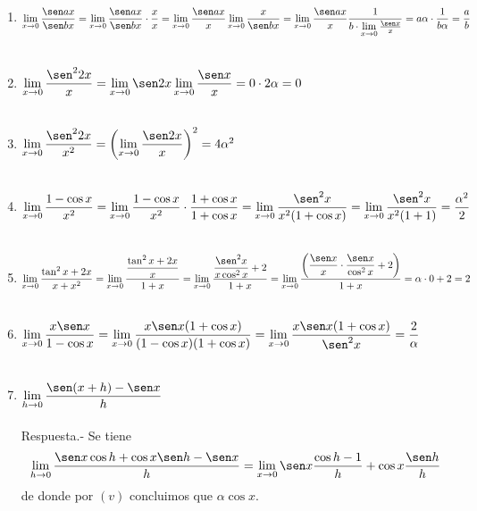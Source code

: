 \begin{enumerate}
\begin{enumerate}[\bfseries (i)]
    \item $\lim\limits_{x \to 0} \dfrac{\sen ax}{\sen bx} = \lim\limits_{x \to 0} \dfrac{\sen ax}{\sen bx}\cdot \dfrac{x}{x} = \lim\limits_{x\to 0} \dfrac{\sen ax}{x} \lim\limits_{x\to 0} \dfrac{x}{\sen bx}  = \lim\limits_{x\to 0} \dfrac{\sen ax}{x} \dfrac{1}{b \cdot \lim\limits_{x\to 0} \frac{\sen x}{x}} = a\alpha \cdot \dfrac{1}{b\alpha} = \dfrac{a}{b}$\\\\

    \item $\lim\limits_{x\to 0} \dfrac{\sen^2 2x}{x} = \lim\limits_{x\to 0} \sen 2x \lim\limits_{x\to 0} \dfrac{\sen x}{x} = 0\cdot 2\alpha = 0$\\\\ 

    \item $\lim\limits_{x\to 0} \dfrac{\sen^2 2x}{x^2} = \left(\lim\limits_{x\to 0} \dfrac{\sen 2x}{x}\right)^2 = 4\alpha ^2$\\\\ 

    \item $\lim\limits_{x\to 0} \dfrac{1 - \cos x}{x^2} = \lim\limits_{x\to 0}\dfrac{1-\cos x}{x^2}\cdot \dfrac{1+\cos x}{1+\cos x} = \lim\limits_{x\to 0} \dfrac{\sen^2 x}{x^2 (1+\cos x)} = \lim\limits_{x\to 0} \dfrac{\sen^2 x}{x^2(1+1)} = \dfrac{\alpha^2}{2}$\\\\

    \item $\lim\limits_{x\to 0} \dfrac{\tan^2 x + 2x}{x+x^2} = \lim\limits_{x\to 0} \dfrac{\dfrac{\tan^2 x + 2x}{x}}{1+x} = \lim\limits_{x\to 0} \dfrac{\dfrac{\sen^2 x}{x\cos^2 x}+2}{1+x} = \lim\limits_{x\to 0} \dfrac{\left(\dfrac{\sen x}{x}\cdot \dfrac{\sen x}{\cos^2 x} + 2\right)}{1+x} = \alpha \cdot 0 + 2 = 2$\\\\

    \item $\lim\limits_{x\to 0} \dfrac{x\sen x}{1 - \cos x} = \lim\limits_{x\to 0} \dfrac{x\sen x (1+\cos x)}{(1-\cos x)(1 + \cos x)} = \lim\limits_{x\to 0} \dfrac{x\sen x (1+\cos x)}{\sen^2 x} = \dfrac{2}{\alpha}$\\\\

    \item $\lim\limits_{h\to 0} \dfrac{\sen (x+h)-\sen x}{h} $\\\\ 
	Respuesta.-\; Se tiene $$\lim\limits_{h\to 0}\dfrac{\sen x\cos h + \cos x \sen h - \sen x}{h} = \lim\limits_{x\to 0}\sen x \dfrac{\cos h - 1}{h} + \cos x \dfrac{\sen h}{h}$$ de donde por $(v)$ concluimos que $\alpha \cos x$.\\\\


\end{enumerate}
\end{enumerate}
